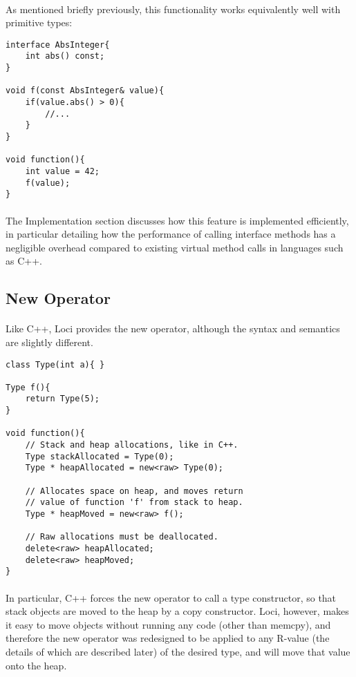 \documentclass[12pt,twoside,notitlepage]{report}
\begin{document}
\paragraph{}
As mentioned briefly previously, this functionality works equivalently well with primitive types:

\begin{lstlisting}
interface AbsInteger{
	int abs() const;
}

void f(const AbsInteger& value){
	if(value.abs() > 0){
		//...
	}
}

void function(){
	int value = 42;
	f(value);
}
\end{lstlisting}

\paragraph{}
The Implementation section discusses how this feature is implemented efficiently, in particular detailing how the performance of calling interface methods has a negligible overhead compared to existing virtual method calls in languages such as C++.

\clearpage

\subsection{New Operator}

\paragraph{}
Like C++, Loci provides the new operator, although the syntax and semantics are slightly different.


\begin{lstlisting}
class Type(int a){ }

Type f(){
	return Type(5);
}

void function(){
	// Stack and heap allocations, like in C++.
	Type stackAllocated = Type(0);
	Type * heapAllocated = new<raw> Type(0);
	
	// Allocates space on heap, and moves return
	// value of function 'f' from stack to heap.
	Type * heapMoved = new<raw> f();
	
	// Raw allocations must be deallocated.
	delete<raw> heapAllocated;
	delete<raw> heapMoved;
}
\end{lstlisting}


\paragraph{}
In particular, C++ forces the new operator to call a type constructor, so that stack objects are moved to the heap by a copy constructor. Loci, however, makes it easy to move objects without running any code (other than memcpy), and therefore the new operator was redesigned to be applied to any R-value (the details of which are described later) of the desired type, and will move that value onto the heap.
\end{document}

